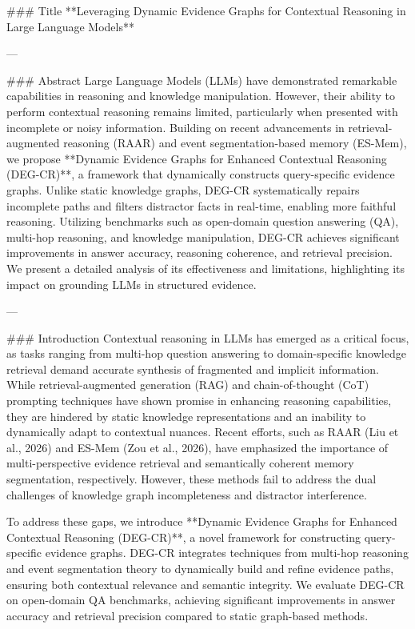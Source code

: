 ### Title
**Leveraging Dynamic Evidence Graphs for Contextual Reasoning in Large Language Models**

---

### Abstract
Large Language Models (LLMs) have demonstrated remarkable capabilities in reasoning and knowledge manipulation. However, their ability to perform contextual reasoning remains limited, particularly when presented with incomplete or noisy information. Building on recent advancements in retrieval-augmented reasoning (RAAR) and event segmentation-based memory (ES-Mem), we propose **Dynamic Evidence Graphs for Enhanced Contextual Reasoning (DEG-CR)**, a framework that dynamically constructs query-specific evidence graphs. Unlike static knowledge graphs, DEG-CR systematically repairs incomplete paths and filters distractor facts in real-time, enabling more faithful reasoning. Utilizing benchmarks such as open-domain question answering (QA), multi-hop reasoning, and knowledge manipulation, DEG-CR achieves significant improvements in answer accuracy, reasoning coherence, and retrieval precision. We present a detailed analysis of its effectiveness and limitations, highlighting its impact on grounding LLMs in structured evidence.

---

### Introduction
Contextual reasoning in LLMs has emerged as a critical focus, as tasks ranging from multi-hop question answering to domain-specific knowledge retrieval demand accurate synthesis of fragmented and implicit information. While retrieval-augmented generation (RAG) and chain-of-thought (CoT) prompting techniques have shown promise in enhancing reasoning capabilities, they are hindered by static knowledge representations and an inability to dynamically adapt to contextual nuances. Recent efforts, such as RAAR (Liu et al., 2026) and ES-Mem (Zou et al., 2026), have emphasized the importance of multi-perspective evidence retrieval and semantically coherent memory segmentation, respectively. However, these methods fail to address the dual challenges of knowledge graph incompleteness and distractor interference.

To address these gaps, we introduce **Dynamic Evidence Graphs for Enhanced Contextual Reasoning (DEG-CR)**, a novel framework for constructing query-specific evidence graphs. DEG-CR integrates techniques from multi-hop reasoning and event segmentation theory to dynamically build and refine evidence paths, ensuring both contextual relevance and semantic integrity. We evaluate DEG-CR on open-domain QA benchmarks, achieving significant improvements in answer accuracy and retrieval precision compared to static graph-based methods.

